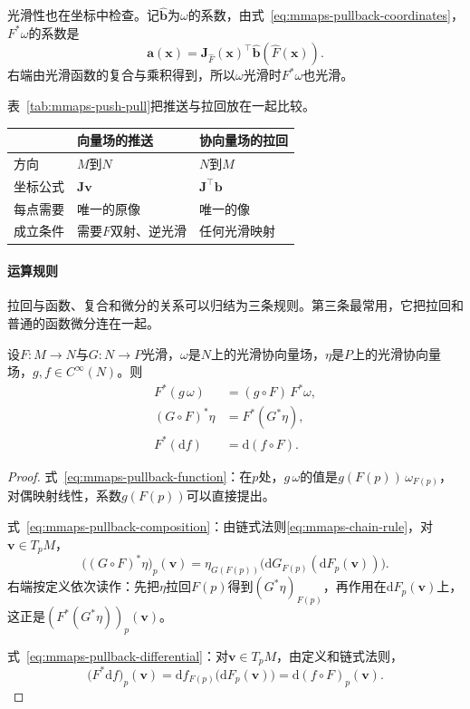 光滑性也在坐标中检查。记$\hat{\bm b}$为$\omega$的系数，由式~\eqref{eq:mmaps-pullback-coordinates}，$F^*\omega$的系数是
\[
\bm a(\bm x)=\bm J_{\hat F}(\bm x)^\top\hat{\bm b}(\hat F(\bm x)).
\]
右端由光滑函数的复合与乘积得到，所以$\omega$光滑时$F^*\omega$也光滑。

表~\ref{tab:mmaps-push-pull}把推送与拉回放在一起比较。

\begin{BookInlineTable}
  \centering
  \begin{tabular}{lll}
    \toprule
     & 向量场的推送 & 协向量场的拉回\\
    \midrule
    方向 & $M$到$N$ & $N$到$M$\\
    坐标公式 & $\bm J\bm v$ & $\bm J^\top\bm b$\\
    每点需要 & 唯一的原像 & 唯一的像\\
    成立条件 & 需要$F$双射、逆光滑 & 任何光滑映射\\
    \bottomrule
  \end{tabular}
  \caption{推送与拉回的比较。}
  \label{tab:mmaps-push-pull}
\end{BookInlineTable}

\paragraph{运算规则}
拉回与函数、复合和微分的关系可以归结为三条规则。第三条最常用，它把拉回和普通的函数微分连在一起。

\begin{theorem}[拉回的运算规则]
\label{thm:mmaps-pullback-rules}
设$F:M\to N$与$G:N\to P$光滑，$\omega$是$N$上的光滑协向量场，$\eta$是$P$上的光滑协向量场，$g,f\in C^\infty(N)$。则
\begin{align}
F^*(g\,\omega)&=(g\circ F)\,F^*\omega ,\label{eq:mmaps-pullback-function}\\
(G\circ F)^*\eta&=F^*(G^*\eta),\label{eq:mmaps-pullback-composition}\\
F^*(\mathrm df)&=\mathrm d(f\circ F).\label{eq:mmaps-pullback-differential}
\end{align}
\end{theorem}

\begin{proof}
式~\eqref{eq:mmaps-pullback-function}：在$p$处，$g\,\omega$的值是$g(F(p))\,\omega_{F(p)}$，对偶映射线性，系数$g(F(p))$可以直接提出。

式~\eqref{eq:mmaps-pullback-composition}：由链式法则\eqref{eq:mmaps-chain-rule}，对$\bm v\in T_pM$，
\[
\bigl((G\circ F)^*\eta\bigr)_p(\bm v)
=\eta_{G(F(p))}\bigl(\mathrm dG_{F(p)}(\mathrm dF_p(\bm v))\bigr).
\]
右端按定义依次读作：先把$\eta$拉回$F(p)$得到$(G^*\eta)_{F(p)}$，再作用在$\mathrm dF_p(\bm v)$上，这正是$(F^*(G^*\eta))_p(\bm v)$。

式~\eqref{eq:mmaps-pullback-differential}：对$\bm v\in T_pM$，由定义和链式法则，
\[
\bigl(F^*\mathrm df\bigr)_p(\bm v)
=\mathrm df_{F(p)}\bigl(\mathrm dF_p(\bm v)\bigr)
=\mathrm d(f\circ F)_p(\bm v).
\]
\end{proof}

